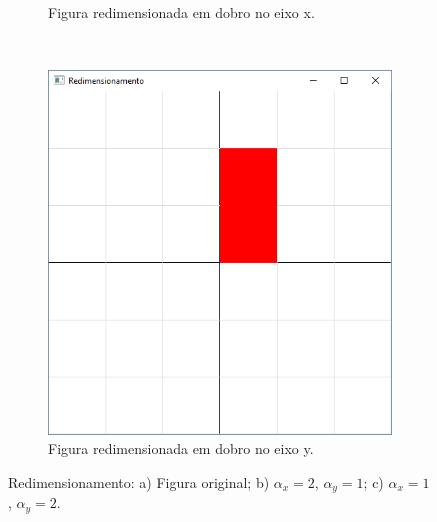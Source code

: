 \begin{figure}[H]
\begin{subfigure}[t]{.25\textwidth}
    \caption{Figura redimensionada em dobro no eixo x.} 
  \end{subfigure}
  ~
  \begin{subfigure}[t]{.25\textwidth}
    \includegraphics[width=.9\textwidth]{img/linear3c}
    \caption{Figura redimensionada em dobro no eixo y.} 
  \end{subfigure}
  \label{fig:linear3}
  \caption{Redimensionamento: a) Figura original; b) $\alpha_x = 2$, $\alpha_y = 1$; c) $\alpha_x = 1$, $\alpha_y = 2$.} 
\end{figure} 






